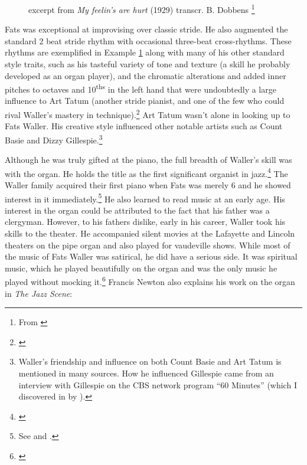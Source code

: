 \documentclass[11pt]{report}
\begin{document}
	
		\begin{figure}[ht]
			\centering
			\begin{minipage}{\textwidth}
				
				\caption{excerpt from \emph{My feelin's are hurt} (1929) transcr. B. Dobbens \protect\footnote{\scriptsize From \cite[]{grove-book:waller}}}
				\label{fig:hurt}
				

				{%
\parindent 0pt
\ifx\preLilyPondExample \undefined
\else
  \expandafter\preLilyPondExample
\fi
\def\lilypondbook{}%

\ifx\postLilyPondExample \undefined
\else
  \expandafter\postLilyPondExample
\fi
}


			\end{minipage}
		\end{figure}

	Fats was exceptional at improvising over classic stride. He also augmented the standard 2 beat stride rhythm with occasional three-beat cross-rhythms. These rhythms are exemplified in Example \ref{fig:hurt} along with many of his other standard style traits, such as his tasteful variety of tone and texture (a skill he probably developed as an organ player), and the chromatic alterations and added inner pitches to octaves and 10\textsuperscript{ths} in the left hand that were undoubtedly a large influence to Art Tatum (another stride pianist, and one of the few who could rival Waller's mastery in technique).\footnote{\cite[40]{grove-book:waller}} Art Tatum wasn't alone in looking up to Fats Waller. His creative style influenced other notable artists such as Count Basie and Dizzy Gillespie.\footnote{Waller's friendship and influence on both Count Basie and Art Tatum is mentioned in many sources. How he influenced Gillespie came from an interview with Gillespie on the CBS network program ``60 Minutes'' (which I discovered in  by \cite{transcriptions}).}



	\label{sec:organ_and_classical}
	Although he was truly gifted at the piano, the full breadth of Waller's skill was with the organ. He holds the title as the first significant organist in jazz.\footnote{\cite[40]{grove-book:waller}} The Waller family acquired their first piano when Fats was merely 6 and he showed interest in it immediately.\footnote{See \cite{transcriptions} and \cite{life}.} He also learned to read music at an early age. His interest in the organ could be attributed to the fact that his father was a clergyman. However, to his fathers dislike, early in his career, Waller took his skills to the theater. He accompanied silent movies at the Lafayette and Lincoln theaters on the pipe organ and also played for vaudeville shows. While most of the music of Fats Waller was satirical, he did have a serious side. It was spiritual music, which he played beautifully on the organ and was the only music he played without mocking it.\footnote{\cite[8]{outside-insider}} Francis Newton also explains his work on the organ in \emph{The Jazz Scene}:
	
\end{document}
